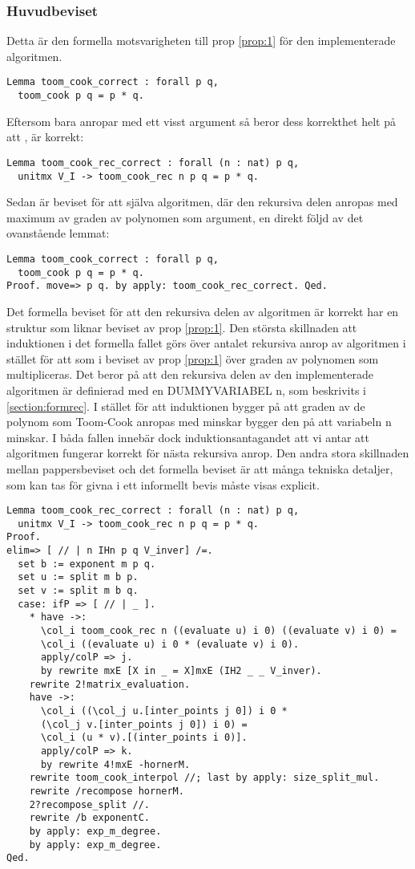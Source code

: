 \subsubsection{Huvudbeviset}
Detta är den formella motsvarigheten till prop \ref{prop:1} för den
implementerade algoritmen.
\begin{lstlisting}
Lemma toom_cook_correct : forall p q,
  toom_cook p q = p * q.
\end{lstlisting}
Eftersom  bara anropar  med ett visst argument så
beror dess korrekthet helt på att , är korrekt:
\begin{lstlisting}
Lemma toom_cook_rec_correct : forall (n : nat) p q,
  unitmx V_I -> toom_cook_rec n p q = p * q.
\end{lstlisting}
Sedan är beviset för att själva algoritmen, där den rekursiva delen anropas med
maximum av graden av polynomen som argument, en direkt följd av det ovanstående
lemmat:
\begin{lstlisting}
Lemma toom_cook_correct : forall p q,
  toom_cook p q = p * q.
Proof. move=> p q. by apply: toom_cook_rec_correct. Qed.
\end{lstlisting}
Det formella beviset för att den rekursiva delen av algoritmen är korrekt har
en struktur som liknar beviset av prop \ref{prop:1}. Den största skillnaden att
induktionen i det formella fallet görs över antalet rekursiva anrop av
algoritmen i stället för att som i beviset av prop \ref{prop:1} över graden av
polynomen som multipliceras. Det beror på att den rekursiva delen av den
implementerade algoritmen är definierad med en DUMMYVARIABEL n, som beskrivits
i \ref{section:formrec}. I stället för att induktionen bygger på att graden av
de polynom som Toom-Cook anropas med minskar bygger den på att variabeln n
minskar. I båda fallen innebär dock induktionsantagandet att vi antar att
algoritmen fungerar korrekt för nästa rekursiva anrop. Den andra stora
skillnaden mellan pappersbeviset och det formella beviset är att många tekniska
detaljer, som kan tas för givna i ett informellt bevis måste visas explicit.
\begin{lstlisting}
Lemma toom_cook_rec_correct : forall (n : nat) p q,
  unitmx V_I -> toom_cook_rec n p q = p * q.
Proof.
elim=> [ // | n IHn p q V_inver] /=.
  set b := exponent m p q.
  set u := split m b p.
  set v := split m b q.
  case: ifP => [ // | _ ].
    * have ->:
      \col_i toom_cook_rec n ((evaluate u) i 0) ((evaluate v) i 0) =
      \col_i ((evaluate u) i 0 * (evaluate v) i 0).
      apply/colP => j.
      by rewrite mxE [X in _ = X]mxE (IH2 _ _ V_inver).
    rewrite 2!matrix_evaluation.
    have ->:
      \col_i ((\col_j u.[inter_points j 0]) i 0 *
      (\col_j v.[inter_points j 0]) i 0) =
      \col_i (u * v).[(inter_points i 0)].
      apply/colP => k.
      by rewrite 4!mxE -hornerM.
    rewrite toom_cook_interpol //; last by apply: size_split_mul.
    rewrite /recompose hornerM.
    2?recompose_split //.
    rewrite /b exponentC.
    by apply: exp_m_degree.
    by apply: exp_m_degree.
Qed.
\end{lstlisting}
